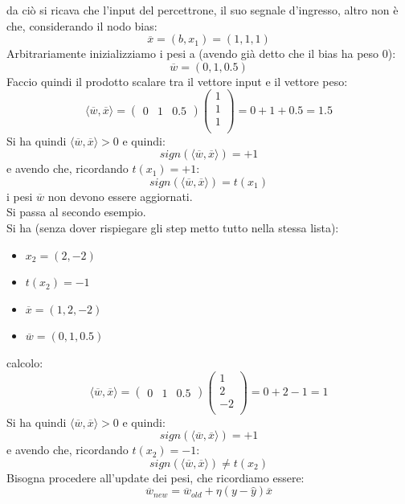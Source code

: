 \documentclass[a4paper,12pt, oneside]{book}
\begin{document}
\begin{esercizio}
  da ciò si ricava che l'input del percettrone, il suo segnale d'ingresso, altro
  non è che, considerando il nodo bias:
  \[\overline{x}=(b, x_1)=(1,1,1)\]
  Arbitrariamente inizializziamo i pesi a (avendo già detto che il bias ha peso
  0):
  \[\overline{w}=(0,1,0.5)\]
  Faccio quindi il prodotto scalare tra il vettore input e il vettore peso:
  \[\langle \overline{w}, \overline{x}\rangle=
    \left(\begin{matrix}
        0 & 1 & 0.5
      \end{matrix}\right)
    \left(
      \begin{matrix}
        1 \\
        1 \\
        1 \\
      \end{matrix}
    \right)= 0 + 1 + 0.5 = 1.5
  \]
  Si ha quindi $\langle \overline{w}, \overline{x}\rangle > 0$ e quindi:
  \[sign(\langle \overline{w}, \overline{x}\rangle)=+1\]
  e avendo che, ricordando $t(x_1)=+1$:
  \[sign(\langle \overline{w}, \overline{x}\rangle)=t(x_1)\]
  i pesi $\overline{w}$ non devono essere aggiornati.\\
  Si passa al secondo esempio.\\
  Si ha (senza dover rispiegare gli step metto tutto nella stessa lista):
  \begin{itemize}
    \item $x_2=(2,-2)$
    \item $t(x_2)=-1$
    \item $\overline{x}=(1,2,-2)$
    \item $\overline{w}=(0, 1, 0.5)$
  \end{itemize}
  calcolo:
  \[\langle \overline{w}, \overline{x}\rangle=
    \left(\begin{matrix}
        0 & 1 & 0.5
      \end{matrix}\right)
    \left(
      \begin{matrix}
        1 \\
        2 \\
        -2 \\
      \end{matrix}
    \right)= 0 + 2 - 1 = 1
  \]
  Si ha quindi $\langle \overline{w}, \overline{x}\rangle > 0$ e quindi:
  \[sign(\langle \overline{w}, \overline{x}\rangle)=+1\]
  e avendo che, ricordando $t(x_2)=-1$:
  \[sign(\langle \overline{w}, \overline{x}\rangle)\neq t(x_2)\]
  Bisogna procedere all'update dei pesi, che ricordiamo essere:
  \[\overline{w}_{new}=\overline{w}_{old}+\eta(y-\hat{y})\overline{x}\]

\end{esercizio}
\end{document}
